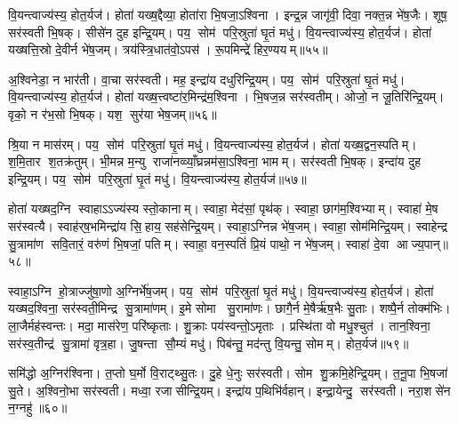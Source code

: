 वि॒यन्त्वाज्य॑स्य॒ होत॒र्यज॑। होता॑ यख्ष॒द्दैव्या॒ होता॑रा भि॒षजा॒ऽश्विना। इन्द्र॒न्न जागृ॑वी॒ दिवा॒ नक्त॒न्न भे॑ष॒जैः। शूष॒ सर॑स्वती भि॒षक्। सीसे॑न दुह इन्द्रि॒यम्। पय॒ सोम॑ परि॒स्रुता॑ घृ॒तं मधु॑। वि॒यन्त्वाज्य॑स्य॒ होत॒र्यज॑। होता॑ यख्षत्ति॒स्रो दे॒वीर्न भे॑ष॒जम्। त्रय॑स्त्रि॒धात॑वो॒ऽपस॑। रू॒पमिन्द्रे॑ हिर॒ण्ययम्॥५५॥

अ॒श्विनेडा॒ न भार॑ती। वा॒चा सर॑स्वती। मह॒ इन्द्रा॑य दधुरिन्द्रि॒यम्। पय॒ सोम॑ परि॒स्रुता॑ घृ॒तं मधु॑। वि॒यन्त्वाज्य॑स्य॒ होत॒र्यज॑। होता॑ यख्ष॒त्त्वष्टा॑र॒मिन्द्र॑म॒श्विना। भि॒षज॒न्न सर॑स्वतीम्। ओजो॒ न जू॒तिरि॑न्द्रि॒यम्। वृको॒ न र॑भ॒सो भि॒षक्। यश॒ सुर॑या भेष॒जम्॥५६॥

श्रि॒या न मास॑रम्। पय॒ सोम॑ परि॒स्रुता॑ घृ॒तं मधु॑। वि॒यन्त्वाज्य॑स्य॒ होत॒र्यज॑। होता॑ यख्ष॒द्वन॒स्पतिम्। श॒मि॒तार श॒तक्र॑तुम्। भी॒मन्न म॒न्यु राजा॑नव्व्याँ॒घ्रन्नम॑सा॒ऽश्विना॒ भामम्। सर॑स्वती भि॒षक्। इन्दा॑य दुह इन्द्रि॒यम्। पय॒ सोम॑ परि॒स्रुता॑ घृ॒तं मधु॑। वि॒यन्त्वाज्य॑स्य॒ होत॒र्यज॑॥५७॥

होता॑ यख्षद॒ग्नि स्वाहाऽऽज्य॑स्य स्तो॒कानाम्। स्वाहा॒ मेद॑सां॒ पृथ॑क्। स्वाहा॒ छाग॑म॒श्विभ्याम्। स्वाहा॑ मे॒ष सर॑स्वत्यै। स्वाह॑र्‌ष॒भमिन्द्रा॑य सि॒हाय॒ सह॑सेन्द्रि॒यम्। स्वाहा॒ऽग्निन्न भे॑ष॒जम्। स्वाहा॒ सोम॑मिन्द्रि॒यम्। स्वाहेन्द्र सु॒त्रामा॑ण सवि॒तारं॒ वरु॑णं भि॒षजां॒ पतिम्। स्वाहा॒ वन॒स्पतिं॑ प्रि॒यं पाथो॒ न भे॑ष॒जम्। स्वाहा॑ दे॒वा आज्य॒पान्॥५८॥

स्वाहा॒ऽग्नि हो॒त्राज्जु॑षा॒णो अ॒ग्निर्भे॑ष॒जम्। पय॒ सोम॑ परि॒स्रुता॑ घृ॒तं मधु॑। वि॒यन्त्वाज्य॑स्य॒ होत॒र्यज॑। होता॑ यख्षद॒श्विना॒ सर॑स्वती॒मिन्द्र सु॒त्रामा॑णम्। इ॒मे सोमा सु॒रामा॑णः। छागै॒र्न मे॒षैर्\mbox{}ऋ॑ष॒भैः सु॒ताः। शष्पै॒र्न तोक्म॑भिः। ला॒जैर्मह॑स्वन्तः। मदा॒ मास॑रेण॒ परि॑ष्कृताः। शु॒क्राः पय॑स्वन्तो॒ऽमृताः। प्रस्थि॑ता वो मधु॒श्चुत॑। तान॒श्विना॒ सर॑स्व॒तीन्द्र॑ सु॒त्रामा॑ वृत्र॒हा। जु॒षन्ता सौ॒म्यं मधु॑। पिब॑न्तु॒ मद॑न्तु वि॒यन्तु॒ सोमम्। होत॒र्यज॑॥५९॥\anuvakamend[वी॒र्य॑व्विँ॒यन्त्वाज्य॑स्य॒ होत॒र्यज॒ नास॑त्या॒ सर॑स्वती॒ मधु॑ हिर॒ण्ययं॑ भेष॒जव्विँ॒यन्त्वाज्य॑स्य॒ होत॒र्यजाज्य॒पान॒मृता॒ पञ्च॑ च (स॒मिधा॒ऽग्नि षट्। तनू॒नपाथ्स॒प्त। नरा॒शस॒मृषि॑। इ॒डेडि॒तो यवै॑र॒ष्टौ। ब॒र्‌हि॒ स॒प्त। दुरो॒ऽश्विना॒ नव॑। सु॒पेश॒सर्‌षि॑। दैव्या॒ होता॑रा॒ सीसे॑न॒ रस॑। ति॒स्रस्त्वष्टा॑रम॒ष्टाव॑ष्टौ। वन॒स्पति॒मृषि॑। अ॒ग्निन्त्रयो॑दश। अ॒श्विना॒ द्वाद॑श त्रयोदश। स॒मिधा॒ऽग्निं बद॑रै॒र्बद॑रै॒र्यवै॑र॒श्विना॒ त्विषि॑म॒श्विना॒ न भे॑ष॒ज रू॒पम॒श्विना॑ भी॒मं भामम् ॥ )]

समि॑द्धो अ॒ग्निर॑श्विना। त॒प्तो घ॒र्मो वि॒राट्थ्सु॒तः। दु॒हे धे॒नुः सर॑स्वती। सोम शु॒क्रमि॒हेन्द्रि॒यम्। त॒नू॒पा भि॒षजा॑ सु॒ते। अ॒श्विनो॒भा सर॑स्वती। मध्वा॒ रजासीन्द्रि॒यम्। इन्द्रा॑य प॒थिभि॑र्वहान्। इन्द्रा॒येन्दु॒ सर॑स्वती। नरा॒शसे॑न न॒ग्नहु॑॥६०॥

